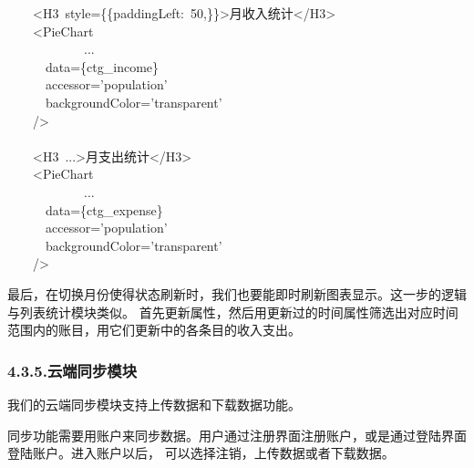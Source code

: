 \documentclass{article}
\begin{document}
\begin{mdpre}%
\noindent~~~~\textless{}H3~style=\{\{paddingLeft:~{50},\}\}\textgreater{}月收入统计\textless{}/H3\textgreater{}\\
~~~~\textless{}PieChart\\
~~~~~~~~~~~~...\\
~~~~~~data=\{ctg\_income\}\\
~~~~~~accessor={'}{population}{'}\\
~~~~~~backgroundColor={'}{transparent}{'}\\
~~~~/\textgreater{}\\
\\
~~~~\textless{}H3~...\textgreater{}月支出统计\textless{}/H3\textgreater{}\\
~~~~\textless{}PieChart\\
~~~~~~~~~~~~...\\
~~~~~~data=\{ctg\_expense\}\\
~~~~~~accessor={'}{population}{'}\\
~~~~~~backgroundColor={'}{transparent}{'}\\
~~~~/\textgreater{}%
\end{mdpre}\noindent{}最后，在切换月份使得状态刷新时，我们也要能即时刷新图表显示。这一步的逻辑与列表统计模块类似。
首先更新属性，然后用更新过的时间属性筛选出对应时间范围内的账目，用它们更新中的各条目的收入支出。

\subsubsection{4.3.5.\hspace*{0.5em}云端同步模块}\label{section}%

\noindent{}我们的云端同步模块支持上传数据和下载数据功能。%

同步功能需要用账户来同步数据。用户通过注册界面注册账户，或是通过登陆界面登陆账户。进入账户以后，
可以选择注销，上传数据或者下载数据。%
\end{document}
